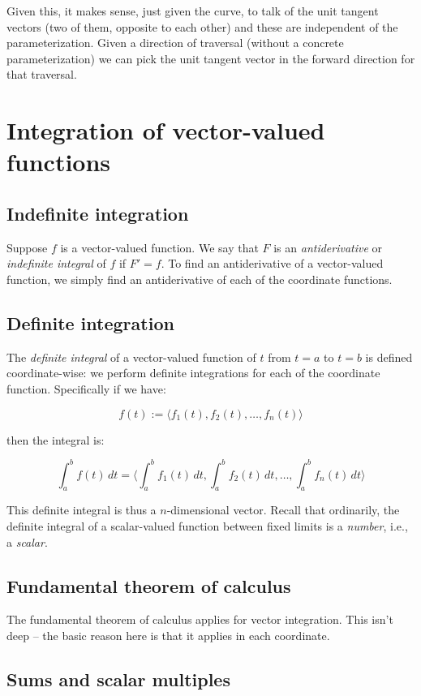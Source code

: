 \documentclass[10pt]{amsart}
\begin{document}
Given this, it makes sense, just given the curve, to talk of the unit
tangent vectors (two of them, opposite to each other) and these are
independent of the parameterization. Given a direction of traversal
(without a concrete parameterization) we can pick the unit tangent
vector in the forward direction for that traversal.

\section{Integration of vector-valued functions}

\subsection{Indefinite integration}

Suppose $f$ is a vector-valued function. We say that $F$ is an {\em
antiderivative} or {\em indefinite integral} of $f$ if $F' = f$. To
find an antiderivative of a vector-valued function, we simply find an
antiderivative of each of the coordinate functions.

\subsection{Definite integration}

The {\em definite integral} of a vector-valued function of $t$ from $t
= a$ to $t = b$ is defined coordinate-wise: we perform definite
integrations for each of the coordinate function. Specifically if we have:

$$f(t) := \langle f_1(t), f_2(t), \dots , f_n(t) \rangle$$

then the integral is:

$$\int_a^b f(t) \, dt = \langle \int_a^b f_1(t) \, dt, \int_a^b f_2(t) \, dt, \dots, \int_a^b f_n(t) \, dt \rangle$$

This definite integral is thus a $n$-dimensional vector. Recall that
ordinarily, the definite integral of a scalar-valued function between
fixed limits is a {\em number}, i.e., a {\em scalar}.

\subsection{Fundamental theorem of calculus}

The fundamental theorem of calculus applies for vector
integration. This isn't deep -- the basic reason here is that it
applies in each coordinate.
\subsection{Sums and scalar multiples}
\end{document}
